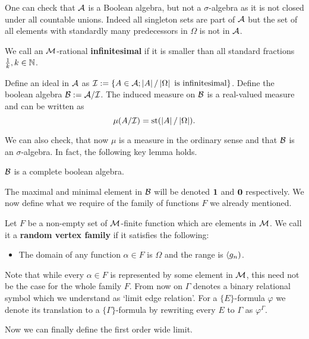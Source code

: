 One can check that $\mathcal{A}$ is a Boolean algebra, but not a $\sigma$-algebra as it is not closed under all countable unions. Indeed all singleton sets are part of $\mathcal{A}$ but the set of all elements with standardly many predecessors in $\Omega$ is not in $\mathcal{A}$.

\begin{defi}\label{defiinfinitesimal}
We call an $\mathcal{M}$-rational \textbf{infinitesimal} if it is smaller than all standard fractions $\frac{1}{k},k\in\mathbb{N}$.

Define an ideal in $\mathcal{A}$ as $\mathcal{I}:=\{A\in\mathcal{A};\left|{A}\right|/\left|{\Omega}\right|\text{ is infinitesimal}\}$. Define the boolean algebra $\mathcal{B}:=\mathcal{A}/\mathcal{I}$. The induced measure on $\mathcal{B}$ is a real-valued measure and can be written as \[\mu(A/\mathcal{I})=\text{st}(\left|{A}\right|/\left|{\Omega}\right|).\]
\end{defi}

We can also check, that now $\mu$ is a measure in the ordinary sense and that $\mathcal{B}$ is an $\sigma$-algebra. In fact, the following key lemma holds.

\begin{lemm}
$\mathcal{B}$ is a complete boolean algebra.
\end{lemm}

The maximal and minimal element in $\mathcal{B}$ will be denoted $\textbf{1}$ and $\textbf{0}$ respectively. We now define what we require of the family of functions $F$ we already mentioned.

\begin{defi}
Let $F$ be a non-empty set of $\mathcal{M}$-finite function which are elements in $\mathcal{M}$. We call it a \textbf{random vertex family} if it satisfies the following:
\begin{itemize}
\item The domain of any function $\alpha\in F$ is $\Omega$ and the range is $\langle g_n)$.
\end{itemize}
\end{defi}

Note that while every $\alpha\in F$ is represented by some element in $\mathcal{M}$, this need not be the case for the whole family $F$. From now on $\Gamma$ denotes a binary relational symbol which we understand as `limit edge relation'. For a $\{E\}$-formula $\varphi$ we denote its translation to a $\{\Gamma\}$-formula by rewriting every $E$ to $\Gamma$ as $\varphi^{\Gamma}$.

Now we can finally define the first order wide limit.

